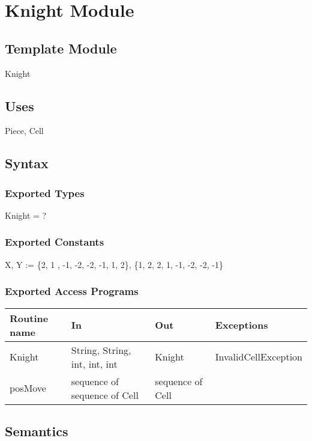 \documentclass[12pt]{article}
\begin{document}
\section* {Knight Module}

\subsection*{Template Module}

Knight

\subsection* {Uses}

Piece, Cell

\subsection* {Syntax}

\subsubsection* {Exported Types}

Knight = ?

\subsubsection* {Exported Constants}

X, Y := \{2, 1 , -1, -2, -2, -1, 1, 2\}, \{1, 2, 2, 1, -1, -2, -2, -1\}

\subsubsection* {Exported Access Programs}

\begin{tabular}{| l | l | l | l |}
\hline
\textbf{Routine name} & \textbf{In} & \textbf{Out} & \textbf{Exceptions}\\
\hline
Knight &String, String, int, int, int & Knight & InvalidCellException\\
\hline
posMove & sequence of sequence of Cell & sequence of Cell & ~\\
\hline
\end{tabular}

\subsection* {Semantics}
\end{document}
